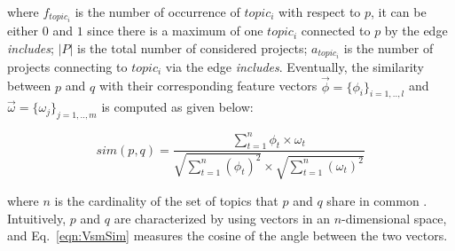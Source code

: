 \noindent
where $f_{topic_{i}}$ is the number of occurrence of $topic_{i}$ with respect to $p$, it can be either $0$ and $1$ since there is a maximum of one $topic_{i}$ connected to $p$ by the edge \emph{includes}; $\left | P \right |$ is the total number of considered projects; $a_{topic_{i}}$ is the number of projects connecting to $topic_{i}$ via the edge \emph{includes}. %
Eventually, the similarity between $p$ and $q$ with their corresponding feature vectors $\overrightarrow{\phi}=\{\phi_{i}\}_{i=1,..,l}$ and $\overrightarrow{\omega}=\{\omega_{j}\}_{j=1,..,m}$ is computed as given below:%

\begin{equation} \label{eqn:VsmSim}
sim(p,q)=\frac{\sum_{t=1}^{n}\phi_{t}\times \omega_{t}}{\sqrt{\sum_{t=1}^{n}(\phi_{t})^{2} }\times \sqrt{\sum_{t=1}^{n}(\omega_{t})^{2}}} 
\end{equation}

where $n$ is the cardinality of the set of topics that $p$ and $q$ share in common \cite{DiNoia:2012:LOD:2362499.2362501}. Intuitively, $p$ and $q$ are characterized by using vectors in an $n$-dimensional space, and Eq.~\ref{eqn:VsmSim} measures the cosine of the angle between the two vectors. %







